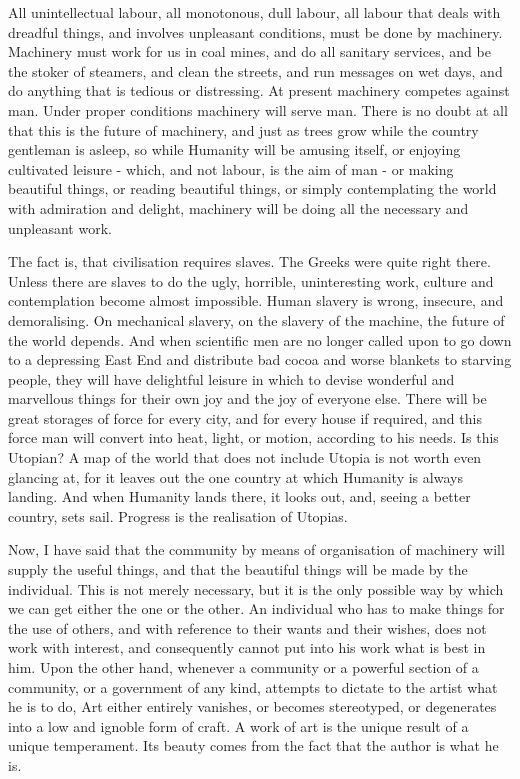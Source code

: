 All unintellectual labour, all monotonous, dull labour, all labour that deals with dreadful things, and involves unpleasant conditions, must be done by machinery. Machinery must work for us in coal mines, and do all sanitary services, and be the stoker of steamers, and clean the streets, and run messages on wet days, and do anything that is tedious or distressing. At present machinery competes against man. Under proper conditions machinery will serve man. There is no doubt at all that this is the future of machinery, and just as trees grow while the country gentleman is asleep, so while Humanity will be amusing itself, or enjoying cultivated leisure - which, and not labour, is the aim of man - or making beautiful things, or reading beautiful things, or simply contemplating the world with admiration and delight, machinery will be doing all the necessary and unpleasant work.\par

The fact is, that civilisation requires slaves. The Greeks were quite right there. Unless there are slaves to do the ugly, horrible, uninteresting work, culture and contemplation become almost impossible. Human slavery is wrong, insecure, and demoralising. On mechanical slavery, on the slavery of the machine, the future of the world depends. And when scientific men are no longer called upon to go down to a depressing East End and distribute bad cocoa and worse blankets to starving people, they will have delightful leisure in which to devise wonderful and marvellous things for their own joy and the joy of everyone else. There will be great storages of force for every city, and for every house if required, and this force man will convert into heat, light, or motion, according to his needs. Is this Utopian? A map of the world that does not include Utopia is not worth even glancing at, for it leaves out the one country at which Humanity is always landing. And when Humanity lands there, it looks out, and, seeing a better country, sets sail. Progress is the realisation of Utopias.\par

Now, I have said that the community by means of organisation of machinery will supply the useful things, and that the beautiful things will be made by the individual. This is not merely necessary, but it is the only possible way by which we can get either the one or the other. An individual who has to make things for the use of others, and with reference to their wants and their wishes, does not work with interest, and consequently cannot put into his work what is best in him. Upon the other hand, whenever a community or a powerful section of a community, or a government of any kind, attempts to dictate to the artist what he is to do, Art either entirely vanishes, or becomes stereotyped, or degenerates into a low and ignoble form of craft. A work of art is the unique result of a unique temperament. Its beauty comes from the fact that the author is what he is.\par

